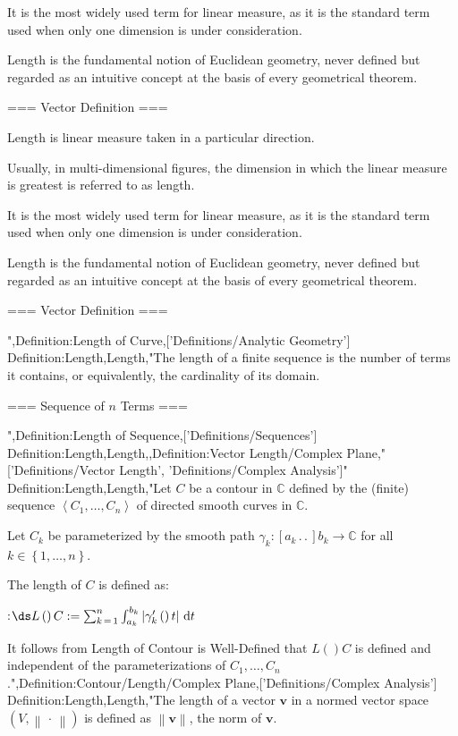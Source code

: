 It is the most widely used term for linear measure, as it is the standard term used when only one dimension is under consideration.


Length is the fundamental notion of Euclidean geometry, never defined but regarded as an intuitive concept at the basis of every geometrical theorem.


=== Vector Definition ===

Length is linear measure taken in a particular direction.

Usually, in multi-dimensional figures, the dimension in which the linear measure is greatest is referred to as length.

It is the most widely used term for linear measure, as it is the standard term used when only one dimension is under consideration.


Length is the fundamental notion of Euclidean geometry, never defined but regarded as an intuitive concept at the basis of every geometrical theorem.


=== Vector Definition ===

",Definition:Length of Curve,['Definitions/Analytic Geometry']
Definition:Length,Length,"The length of a finite sequence is the number of terms it contains, or equivalently, the cardinality of its domain.


=== Sequence of $n$ Terms ===

",Definition:Length of Sequence,['Definitions/Sequences']
Definition:Length,Length,,Definition:Vector Length/Complex Plane,"['Definitions/Vector Length', 'Definitions/Complex Analysis']"
Definition:Length,Length,"Let $C$ be a contour in $\mathbb C$ defined by the (finite) sequence $\left\langle C_1, \ldots, C_n \right\rangle$ of directed smooth curves in $\mathbb C$.

Let $C_k$ be parameterized by the smooth path $\gamma_k: \left[ a_k \,.\,.\,   \right]{b_k} \to \mathbb C$ for all $k \in \left\lbrace 1, \ldots, n \right\rbrace$.


The length of $C$ is defined as:

:$\ds L \left(   \right)C := \sum_{k \mathop = 1}^n \int_{a_k}^{b_k} \left\lvert \gamma_k' \left(   \right)t \right\rvert \,\mathrm d t$


It follows from Length of Contour is Well-Defined that $L \left(   \right)C$ is defined and independent of the parameterizations of $C_1, \ldots, C_n$.",Definition:Contour/Length/Complex Plane,['Definitions/Complex Analysis']
Definition:Length,Length,"The length of a vector $\mathbf v$ in a normed vector space $\left( V, \left\lVert \, \cdot \, \right\rVert  \right)$ is defined as $\left\lVert \mathbf v \right\rVert$, the norm of $\mathbf v$.


